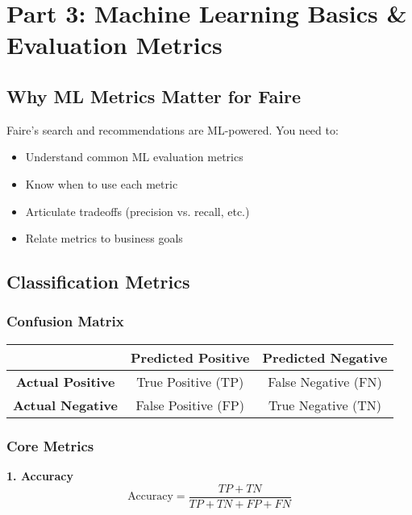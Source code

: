 \documentclass[11pt,letterpaper]{article}
\begin{document}
\section{Part 3: Machine Learning Basics \& Evaluation Metrics}

\subsection{Why ML Metrics Matter for Faire}

Faire's search and recommendations are ML-powered. You need to:
\begin{itemize}
    \item Understand common ML evaluation metrics
    \item Know when to use each metric
    \item Articulate tradeoffs (precision vs. recall, etc.)
    \item Relate metrics to business goals
\end{itemize}

\subsection{Classification Metrics}

\subsubsection{Confusion Matrix}

\begin{center}
\begin{tabular}{|c|c|c|}
\hline
& \textbf{Predicted Positive} & \textbf{Predicted Negative} \\
\hline
\textbf{Actual Positive} & True Positive (TP) & False Negative (FN) \\
\hline
\textbf{Actual Negative} & False Positive (FP) & True Negative (TN) \\
\hline
\end{tabular}
\end{center}

\subsubsection{Core Metrics}

\textbf{1. Accuracy}
\begin{equation}
\text{Accuracy} = \frac{TP + TN}{TP + TN + FP + FN}
\end{equation}
\end{document}
